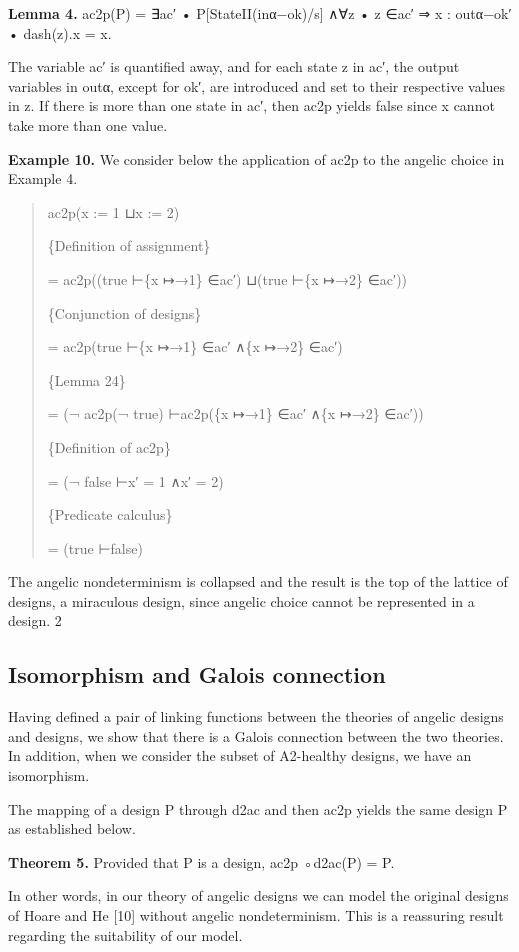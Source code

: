\documentclass[11pt]{article}
\begin{document}
\noindent\textbf{Lemma 4.} ac2p(P) = ∃ac′ • P[StateII(inα−ok)/s] ∧∀z • z ∈ac′ ⇒ x : outα−ok′ • dash(z).x = x.


The variable ac′ is quantified away, and for each state z in ac′, the output variables in outα, except for ok′, are introduced and set to their respective values in z. If there is more than one state in ac′, then ac2p yields false since x cannot take more than one value.

\noindent\textbf{Example 10.} We consider below the application of ac2p to the angelic choice in Example 4.


\begin{quote}\small\raggedright
ac2p(x := 1 ⊔x := 2)
\par
\{Definition of assignment\}
\par
= ac2p((true ⊢\{x ↦→1\} ∈ac′) ⊔(true ⊢\{x ↦→2\} ∈ac′))
\par
\{Conjunction of designs\}
\par
= ac2p(true ⊢\{x ↦→1\} ∈ac′ ∧\{x ↦→2\} ∈ac′)
\par
\{Lemma 24\}
\par
= (¬ ac2p(¬ true) ⊢ac2p(\{x ↦→1\} ∈ac′ ∧\{x ↦→2\} ∈ac′))
\par
\{Definition of ac2p\}
\par
= (¬ false ⊢x′ = 1 ∧x′ = 2)
\par
\{Predicate calculus\}
\par
= (true ⊢false)
\end{quote}

The angelic nondeterminism is collapsed and the result is the top of the lattice of designs, a miraculous design, since angelic choice cannot be represented in a design. 2

\subsection{Isomorphism and Galois connection}
Having defined a pair of linking functions between the theories of angelic designs and designs, we show that there is a Galois connection between the two theories. In addition, when we consider the subset of A2-healthy designs, we have an isomorphism.

The mapping of a design P through d2ac and then ac2p yields the same design P as established below.

\noindent\textbf{Theorem 5.} Provided that P is a design, ac2p ◦d2ac(P) = P.


In other words, in our theory of angelic designs we can model the original designs of Hoare and He [10] without angelic nondeterminism. This is a reassuring result regarding the suitability of our model.
\end{document}
